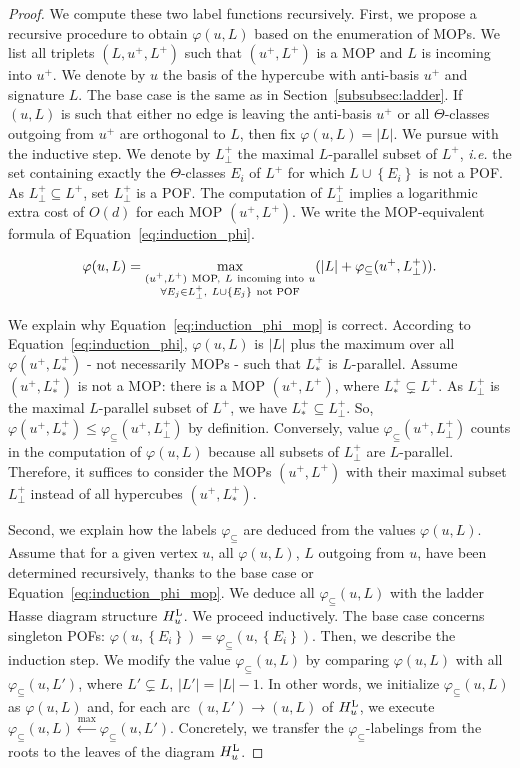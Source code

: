 \documentclass{article}
\newcommand{\set}[1]{\left\{ #1 \right\}}
\newcommand{\card}[1]{\left| #1 \right|}
\newcommand{\hul}{H_u^{\mbox{\scriptsize{L}}}}
\newcommand{\varphis}{\varphi_{\subseteq}}
\begin{document}
\begin{proof}
We compute these two label functions recursively. First, we propose a recursive procedure to obtain $\varphi(u,L)$ based on the enumeration of MOPs. We list all triplets $(L,u^+,L^+)$ such that $(u^+,L^+)$ is a MOP and $L$ is incoming into $u^+$. We denote by $u$ the basis of the hypercube with anti-basis $u^+$ and signature $L$. 
The base case is the same as in Section~\ref{subsubsec:ladder}. If $(u,L)$ is such that either no edge is leaving the anti-basis $u^+$ or all $\Theta$-classes outgoing from $u^+$ are orthogonal to $L$, then fix $\varphi(u,L) = \card{L}$. 
We pursue with the inductive step. We denote by $L_{\perp}^+$ the maximal $L$-parallel subset of $L^+$, {\em i.e.} the set containing exactly the $\Theta$-classes $E_i$ of $L^+$ for which $L \cup \set{E_i}$ is not a POF. As $L_{\perp}^+ \subseteq L^+$, set $L_{\perp}^+$ is a POF. The computation of $L_{\perp}^+$ implies a logarithmic extra cost of $O(d)$ for each MOP $(u^+,L^+)$. We write the MOP-equivalent formula of Equation~\eqref{eq:induction_phi}.

\begin{equation}
     \varphi(u,L) = \max\limits_{\substack{(u^+,L^+) ~\mbox{\scriptsize{MOP,}}~ L ~\mbox{\scriptsize{incoming into}}~ u  \\ \forall E_j \in L_{\perp}^+,~ L \cup \set{E_j} ~\mbox{\scriptsize{not POF}}}} (\card{L} + \varphis(u^+,L_{\perp}^+)).
    \label{eq:induction_phi_mop}
\end{equation}

We explain why Equation~\eqref{eq:induction_phi_mop} is correct. According to Equation~\eqref{eq:induction_phi}, $\varphi(u,L)$ is $\card{L}$ plus the maximum over all $\varphi(u^+,L_*^+)$ - not necessarily MOPs - such that $L_*^+$ is $L$-parallel. Assume $(u^+,L_*^+)$ is not a MOP: there is a MOP $(u^+,L^+)$, where $L_*^+ \subsetneq L^+$. As $L_{\perp}^+$ is the maximal $L$-parallel subset of $L^+$, we have $L_*^+ \subseteq L_{\perp}^+$. So, $\varphi(u^+,L_*^+) \le \varphis(u^+,L_{\perp}^+)$ by definition. Conversely, value $\varphis(u^+,L_{\perp}^+)$ counts in the computation of $\varphi(u,L)$ because all subsets of $L_{\perp}^+$ are $L$-parallel. Therefore, it suffices to consider the MOPs $(u^+,L^+)$ with their maximal subset $L_{\perp}^+$ instead of all hypercubes $(u^+,L_*^+)$.

Second, we explain how the labels $\varphis$ are deduced from the values $\varphi(u,L)$. Assume that for a given vertex $u$, all $\varphi(u,L)$, $L$ outgoing from $u$, have been determined recursively, thanks to the base case or Equation~\eqref{eq:induction_phi_mop}. We deduce all $\varphis(u,L)$ with the ladder Hasse diagram structure $\hul$. We proceed inductively. The base case concerns singleton POFs: $\varphi(u,\set{E_i}) = \varphis(u,\set{E_i})$. Then, we describe the induction step. We modify the value $\varphis(u,L)$ by comparing $\varphi(u,L)$ with all $\varphis(u,L')$, where $L' \subsetneq L$, $\card{L'} = \card{L} -1$. In other words, we initialize $\varphis(u,L)$ as $\varphi(u,L)$ and, for each arc $(u,L')\rightarrow (u,L)$ of $\hul$, we execute $\varphis(u,L) \xleftarrow{\max} \varphis(u,L')$. Concretely, we transfer the $\varphis$-labelings from the roots to the leaves of the diagram $\hul$.


\end{proof}
\end{document}
